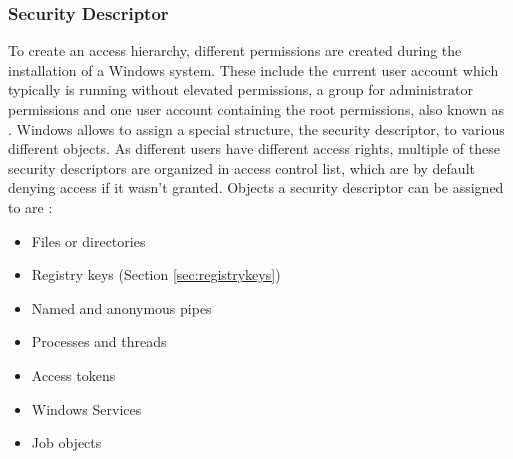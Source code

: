 \subsubsection{Security Descriptor}
\label{sec:sd}
To create an access hierarchy, different permissions are created during the installation of a Windows system. These include the current user account which typically is running without elevated permissions, a group for administrator permissions and one user account containing the root permissions, also known as  \cite{msdn_localsystem1, msdn_localsystem2}. Windows allows to assign a special structure, the security descriptor, to various different objects. As different users have different access rights, multiple of these security descriptors are organized in access control list, which are by default denying access if it wasn't granted. Objects a security descriptor can be assigned to are \cite{msdn_sd}:
\begin{itemize}
\item Files or directories
\item Registry keys (Section \ref{sec:registrykeys})
\item Named and anonymous pipes
\item Processes and threads
\item Access tokens
\item Windows Services
\item Job objects
\end{itemize}